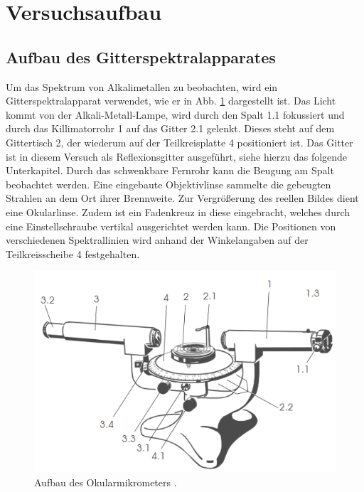 \section{Versuchsaufbau}
\label{sec:Versuchaufbau}

\subsection{Aufbau des Gitterspektralapparates}
Um das Spektrum von Alkalimetallen zu beobachten, wird ein Gitterspektralapparat verwendet, wie er in Abb. \ref{fig:Aufbau} dargestellt ist.
Das Licht kommt von der Alkali-Metall-Lampe, wird durch den Spalt 1.1 fokussiert und durch das Killimatorrohr 1 auf das Gitter 2.1 gelenkt. Dieses steht auf dem Gittertisch 2, der wiederum auf der Teilkreisplatte 4 positioniert ist. Das Gitter ist in diesem Versuch als Reflexionsgitter ausgeführt, siehe hierzu das folgende Unterkapitel. Durch das schwenkbare Fernrohr kann die Beugung am Spalt beobachtet werden. Eine eingebaute Objektivlinse sammelte die gebeugten Strahlen an dem Ort ihrer Brennweite. Zur Vergrößerung des reellen Bildes dient eine Okularlinse. Zudem ist ein Fadenkreuz in diese eingebracht, welches durch eine Einstellschraube vertikal ausgerichtet werden kann. Die Positionen von verschiedenen Spektrallinien wird anhand der Winkelangaben auf der Teilkreisscheibe 4  festgehalten.
\begin{figure}
  \centering
  \includegraphics{ressources/Aufbau.pdf}
  \caption{Aufbau des Okularmikrometers \cite{skript}.}
  \label{fig:Aufbau}
\end{figure}

